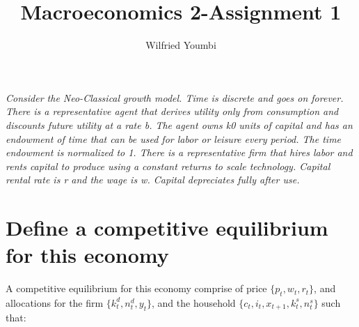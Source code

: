 \documentclass[12pt,a4paper]{article}
\begin{document}
\begin{titlepage}
\title{Macroeconomics 2-Assignment 1 }
\end{titlepage}
\author{Wilfried Youmbi\\} 
\maketitle

\emph{Consider the Neo-Classical growth model. Time is discrete and goes on forever.
There is a representative agent that derives utility only from consumption and discounts
future utility at a rate b. The agent owns k0 units of capital and has an endowment
of time that can be used for labor or leisure every period. The time endowment
is normalized to 1. There is a representative firm that hires labor and rents capital to
produce using a constant returns to scale technology. Capital rental rate is r and the
wage is w. Capital depreciates fully after use.}

\section{Define a competitive equilibrium for this economy}

A competitive equilibrium for this economy comprise of price $\{p_{t}, w_{t}, r_{t}\}$, and allocations for the firm $\{k^{d}_{t}, n^{d}_{t}, y_{t}\}$, and the household $\{c_{t}, i_{t}, x_{t+1}, k_{t}^{s}, n_{t}^{s}\}$ such that:
\end{document}
